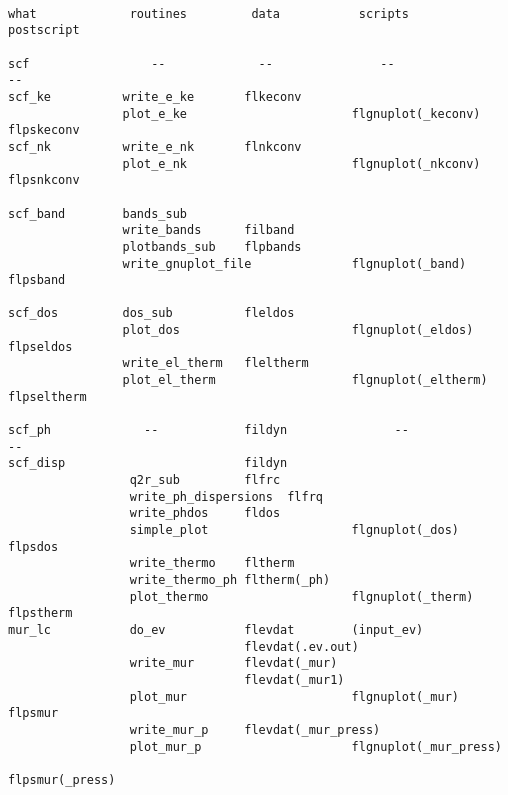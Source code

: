 \documentclass[12pt,a4paper,twoside]{report}
\begin{document}
\begin{footnotesize}
\begin{verbatim}

what             routines         data           scripts            postscript

scf                 --             --               --                 --
scf_ke          write_e_ke       flkeconv
                plot_e_ke                       flgnuplot(_keconv)  flpskeconv
scf_nk          write_e_nk       flnkconv
                plot_e_nk                       flgnuplot(_nkconv)  flpsnkconv

scf_band        bands_sub
                write_bands      filband
                plotbands_sub    flpbands
                write_gnuplot_file              flgnuplot(_band)    flpsband     

scf_dos         dos_sub          fleldos
                plot_dos                        flgnuplot(_eldos)   flpseldos
                write_el_therm   fleltherm
                plot_el_therm                   flgnuplot(_eltherm) flpseltherm

scf_ph             --            fildyn               --                  --
scf_disp                         fildyn
                 q2r_sub         flfrc
                 write_ph_dispersions  flfrq
                 write_phdos     fldos
                 simple_plot                    flgnuplot(_dos)     flpsdos
                 write_thermo    fltherm
                 write_thermo_ph fltherm(_ph)
                 plot_thermo                    flgnuplot(_therm)   flpstherm
mur_lc           do_ev           flevdat        (input_ev)
                                 flevdat(.ev.out)
                 write_mur       flevdat(_mur)
                                 flevdat(_mur1)
                 plot_mur                       flgnuplot(_mur)     flpsmur
                 write_mur_p     flevdat(_mur_press)
                 plot_mur_p                     flgnuplot(_mur_press) 
                                                                flpsmur(_press)


\end{verbatim}
\end{footnotesize}
\end{document}
